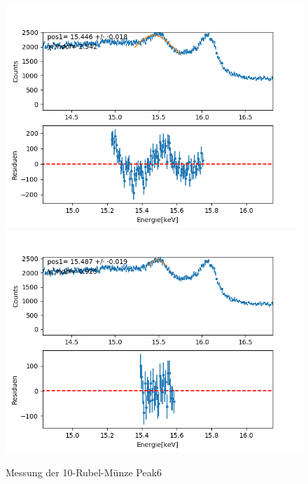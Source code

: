 \documentclass[12pt,a4paper]{article}
\begin{document}
\begin{figure}[H]
\centering
\includegraphics[scale=0.49]{Bilder/roentgen_spektren/rubel/rub7_1.png}
\includegraphics[scale=0.49]{Bilder/roentgen_spektren/rubel/rub7_2.png}
\caption{Messung der 10-Rubel-Münze Peak6}
\end{figure}
\end{document}
